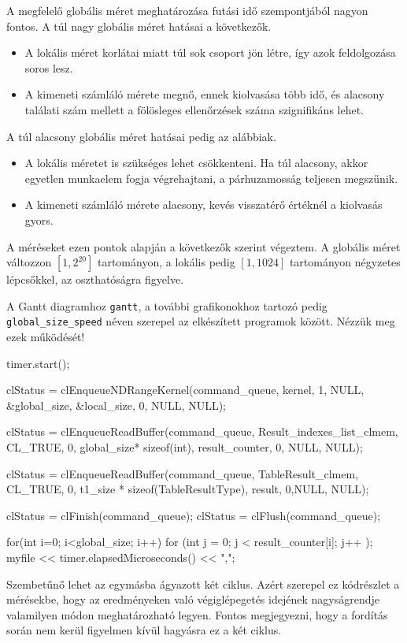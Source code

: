 A megfelelő globális méret meghatározása futási idő szempontjából nagyon fontos.
\noindent
A túl nagy globális méret hatásai a következők.
\begin{itemize}
\item A lokális méret korlátai miatt túl sok csoport jön létre, így azok feldolgozása soros lesz.
\item A kimeneti számláló mérete megnő, ennek kiolvasása több idő, és alacsony találati szám mellett a fölösleges ellenőrzések száma szignifikáns lehet.
\end{itemize}
\noindent
A túl alacsony globális méret hatásai pedig az alábbiak.
\begin{itemize}
\item A lokális méretet is szükséges lehet csökkenteni. Ha túl alacsony, akkor egyetlen munkaelem fogja végrehajtani, a párhuzamosság teljesen megszűnik.
\item A kimeneti számláló mérete alacsony, kevés visszatérő értéknél a kiolvasás gyors.
\end{itemize}
A méréseket ezen pontok alapján a következők szerint végeztem.
A globális méret változzon $[1, 2^{20}]$ tartományon, a lokális pedig $[1, 1024]$ tartományon négyzetes lépcsőkkel, az oszthatóságra figyelve.

A Gantt diagramhoz \texttt{gantt}, a további grafikonokhoz tartozó pedig \\
\texttt{global\_size\_speed} néven szerepel az elkészített programok között. Nézzük meg ezek működését!
\begin{python}  
timer.start();

clStatus = clEnqueueNDRangeKernel(command_queue, kernel, 1, NULL, 
	&global_size, &local_size, 0, NULL, NULL);

clStatus =
	clEnqueueReadBuffer(command_queue, Result_indexes_list_clmem, 
	CL_TRUE, 0, global_size* sizeof(int), 
	result_counter, 0, NULL, NULL);
	
clStatus = clEnqueueReadBuffer(command_queue, TableResult_clmem, 
	CL_TRUE, 0, t1_size * sizeof(TableResultType), 
	result, 0,NULL, NULL);

clStatus = clFinish(command_queue);
clStatus = clFlush(command_queue);

for(int i=0; i<global_size; i++)
{
    for (int j = 0; j < result_counter[i]; j++ );
}
myfile << timer.elapsedMicroseconds() << ",";  
\end{python}

Szembetűnő lehet az egymásba ágyazott két ciklus. Azért szerepel ez kódrészlet a mérésekbe, hogy az eredményeken való végiglépegetés idejének nagyságrendje valamilyen módon meghatározható legyen. Fontos megjegyezni, hogy a fordítás során nem kerül figyelmen kívül hagyásra ez a két ciklus.

